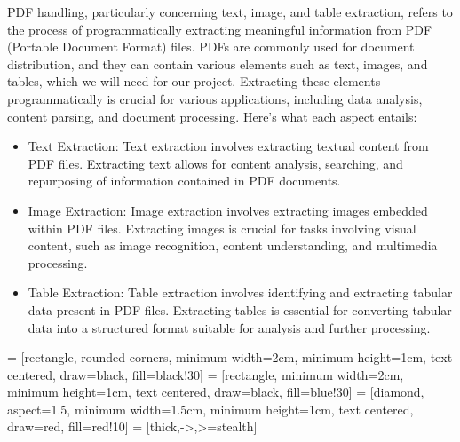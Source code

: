 PDF handling, particularly concerning text, image, and table extraction, refers to the process of programmatically extracting meaningful information from PDF (Portable Document Format) files. PDFs are commonly used for document distribution, and they can contain various elements such as text, images, and tables, which we will need for our project. Extracting these elements programmatically is crucial for various applications, including data analysis, content parsing, and document processing. Here's what each aspect entails:
\begin{itemize}
\item Text Extraction: Text extraction involves extracting textual content from PDF files. Extracting text allows for content analysis, searching, and repurposing of information contained in PDF documents.

\item Image Extraction: Image extraction involves extracting images embedded within PDF files. Extracting images is crucial for tasks involving visual content, such as image recognition, content understanding, and multimedia processing.

\item Table Extraction: Table extraction involves identifying and extracting tabular data present in PDF files. Extracting tables is essential for converting tabular data into a structured format suitable for analysis and further processing.
\end{itemize}

\newpage

\usetikzlibrary{shapes.geometric, arrows}

 = [rectangle, rounded corners, minimum width=2cm, minimum height=1cm, text centered, draw=black, fill=black!30]
 = [rectangle, minimum width=2cm, minimum height=1cm, text centered, draw=black, fill=blue!30]
 = [diamond, aspect=1.5, minimum width=1.5cm, minimum height=1cm, text centered, draw=red, fill=red!10]
 = [thick,->,>=stealth]


